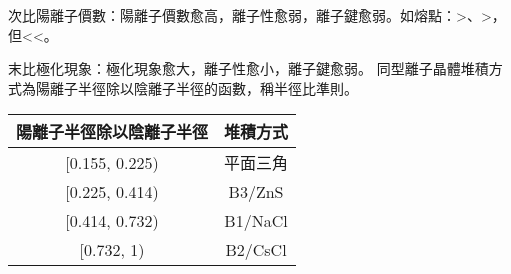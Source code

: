 \documentclass[a4paper,12pt]{report}
\begin{document}
\item 次比陽離子價數：陽離子價數愈高，離子性愈弱，離子鍵愈弱。如熔點：>、>，但<<。
\item 末比極化現象：極化現象愈大，離子性愈小，離子鍵愈弱。
\eit
{}
同型離子晶體堆積方式為陽離子半徑除以陰離子半徑的函數，稱半徑比準則。
\begin{longtable}[c]{|c|c|}
\hline
陽離子半徑除以陰離子半徑 & 堆積方式 \\\hline\endhead
[0.155, 0.225) & 平面三角 \\\hline
[0.225, 0.414) & B3/ZnS \\\hline
[0.414, 0.732) & B1/NaCl \\\hline
[0.732, 1) & B2/CsCl \\\hline
\end{longtable}\FB
\end{document}

